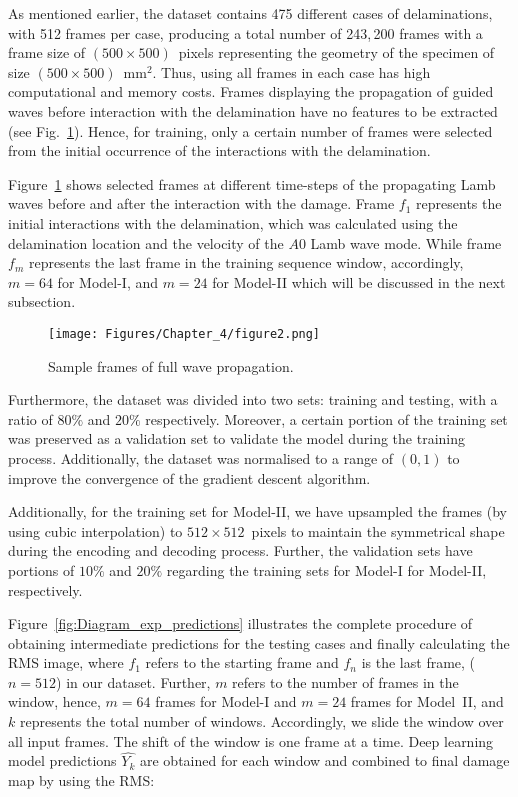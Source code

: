 As mentioned earlier, the dataset contains 475 different cases of delaminations, with 512 frames per case, producing a total number of 243,\,200 frames with a frame size of \((500\times500)\)~pixels representing the geometry of the specimen of size \((500\times500)\)~mm\(^{2}\).
Thus, using all frames in each case has high computational and memory costs.
Frames displaying the propagation of guided waves before interaction with the delamination have no features to be extracted (see Fig.~\ref{fig:Full_wave}).
Hence, for training, only a certain number of frames were selected from the initial occurrence of the interactions with the delamination.

Figure~\ref{fig:Full_wave} shows selected frames at different time-steps of the propagating Lamb waves before and after the interaction with the damage.
Frame \(f_{1}\) represents the initial interactions with the delamination, which was calculated using the delamination location and the velocity of the \(A0\) Lamb wave mode.
While frame \(f_{m}\) represents the last frame in the training sequence window, accordingly, \(m=64\) for Model-I, and \(m=24\) for Model-II which will be discussed in the next subsection.
\begin{figure}[!h]
	\centering
	\texttt{[image: Figures/Chapter\_4/figure2.png]}
	\caption{Sample frames of full wave propagation.}
	\label{fig:Full_wave}
\end{figure}

Furthermore, the dataset was divided into two sets: training and testing, with a ratio of \(80\%\) and \(20\% \) respectively.
Moreover, a certain portion of the training set was preserved as a validation set to validate the model during the training process.
Additionally, the dataset was normalised to a range of \((0, 1)\) to improve the convergence of the gradient descent algorithm.

Additionally, for the training set for Model-II, we have upsampled the frames (by using cubic interpolation) to \(512\times512\)~pixels to maintain the symmetrical shape during the encoding and decoding process.
Further, the validation sets have portions of \(10\%\) and \(20\%\) regarding the training sets for Model-I for Model-II, respectively.

Figure~\ref{fig:Diagram_exp_predictions} illustrates the complete procedure of obtaining intermediate predictions for the testing cases and finally calculating the RMS image, where \(f_{1}\) refers to the starting frame and \(f_{n}\) is the last frame, (\(n=512\)) in our dataset.
Further, \(m\) refers to the number of frames in the window, hence, \(m=64\) frames for Model-I and \(m=24\) frames for Model~II, and \(k\) represents the total number of windows.
Accordingly, we slide the window over all input frames.
The shift of the window is one frame at a time.
Deep learning model predictions \(\hat{Y_k}\) are obtained for each window and combined to final damage map by using the RMS:

